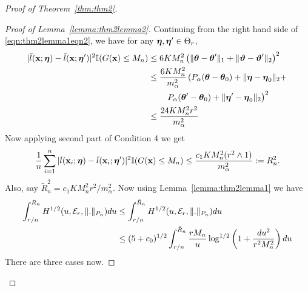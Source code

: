 \documentclass[11pt,letterpaper]{article}
\numberwithin{equation}{section}
\begin{document}
\begin{proof}[Proof of Theorem~\ref{thm:thm2}]
\begin{proof}[Proof of Lemma~\ref{lemma:thm2lemma2}]
Continuing from the right hand side of \eqref{eqn:thm2lemma1eqn2}, we have for any ${\boldsymbol{\eta}}, {\boldsymbol{\eta}}' \in \Theta_r$,
%
\begin{align*}
| \bar l({\bf{x}}; {\boldsymbol{\eta}}) -  \bar l( {\bf{x}}; {\boldsymbol{\eta}}')|^2 {\mathbb{I}}(G({\bf{x}}) \leq M_n ) & \leq
6K M_n^2 \left( \| {\boldsymbol{\theta}} - {\boldsymbol{\theta}}'\|_1 + \| {\boldsymbol{\vartheta}} - {\boldsymbol{\vartheta}}' \|_2 \right)^2\\
& \leq \frac{6 K M_n^2}{m_\alpha^2}
\left( P_\alpha( {\boldsymbol{\theta}} - {\boldsymbol{\theta}}_0) + \| {\boldsymbol{\eta}} - {\boldsymbol{\eta}}_0 \|_2 + \right.\\
& \qquad \left. P_\alpha( {\boldsymbol{\theta}}' - {\boldsymbol{\theta}}_0) + \| {\boldsymbol{\eta}}' - {\boldsymbol{\eta}}_0 \|_2 \right)^2\\
& \leq \frac{24 K M_n^2 r^2}{m_\alpha^2}
\end{align*}
%
Now applying second part of Condition 4 we get
%
\begin{align}\label{eqn:thm2lemma2eqn1}
\frac{1}{n} \sum_{i=1}^n | \bar l({\bf{x}}_i; {\boldsymbol{\eta}}) -  \bar l( {\bf{x}}_i; {\boldsymbol{\eta}}')|^2 {\mathbb{I}}(G({\bf{x}}) \leq M_n ) \leq
\frac{c_1 K M_n^2 ( r^2 \wedge 1)}{m_\alpha^2} := R_n^2.
\end{align}
%
Also, say $\tilde R_n^2 = c_1 K M_n^2 r^2 /m_\alpha^2$. Now using Lemma~\ref{lemma:thm2lemma1} we have
%
\begin{align}
\int_{r/n}^{R_n} H^{1/2} (u, {\cal{E}}_r, \|.\|_{P_n}) du & \leq
\int_{r/n}^{\tilde R_n} H^{1/2} (u, {\cal{E}}_r, \|.\|_{P_n}) du \notag\\
& \leq ( 5 + c_0 )^{1/2}  \int_{r/n}^{\tilde R_n}
\frac{ r M_n }{u} \log^{1/2} \left( 1 + \frac{ d u^2}{r^2 M_n^2} \right) du \label{eqn:thm2lemma2eqn2}
\end{align}
%
%
%
%
There are three cases now.


\end{proof}
\end{proof}
\end{document}
